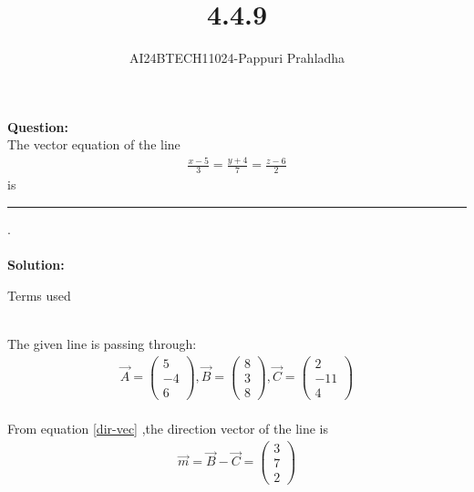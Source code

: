 \documentclass[journal]{IEEEtran}
\begin{document}

\vspace{3cm}

\title{4.4.9}
\author{AI24BTECH11024-Pappuri Prahladha}
{\let\newpage\relax\maketitle}

\renewcommand{\thefigure}{\theenumi}
\renewcommand{\thetable}{\theenumi}
\setlength{\intextsep}{10pt} %


\renewcommand{\thetable}{\theenumi}


\textbf{Question:}\\
The vector equation of the line 
\begin{align*}
	\frac{x-5}{3}=\frac{y+4}{7}=\frac{z-6}{2} 
\end{align*}
is \noindent\rule{1cm}{0.1pt}.\\
\\
\textbf{Solution: }\\
\begin{table}[h!]
    \renewcommand{\thetable}{1}
    \centering
    
    \caption{Terms used}
    \label{TABLE 1:}
\end{table}\\
The given line is passing through: \\
\begin{align*}
\vec{A}=\begin{pmatrix}
5\\
-4\\
6
\end{pmatrix},
\vec{B}=\begin{pmatrix}
8\\
3\\
8
\end{pmatrix},
\vec{C}=\begin{pmatrix}
2\\
-11\\
4
\end{pmatrix}   
\end{align*}\\
 From equation \eqref{dir-vec} ,the direction vector of the line is\\
\begin{align}
\vec{m}=\vec{B}-\vec{C}=\begin{pmatrix}
3\\
7\\
2
\end{pmatrix}  
\end{align}\\
\end{document}
